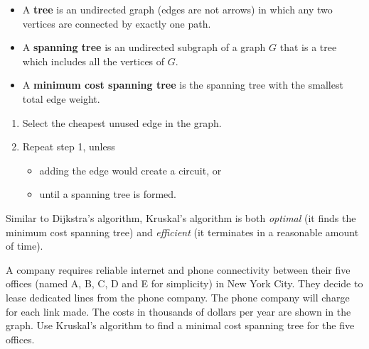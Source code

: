 \begin{definition}
  \begin{itemize}
  \item A \textbf{tree} is an undirected graph (edges are not arrows)
    in which any two vertices are connected by exactly one path.
  \item A \textbf{spanning tree} is an undirected subgraph of a graph
    \(G\) that is a tree which includes all the vertices of \(G\).
  \item A \textbf{minimum cost spanning tree} is the spanning tree
    with the smallest total edge weight.
  \end{itemize}
\end{definition}

\begin{algorithm}
  \begin{enumerate}
  \item Select the cheapest unused edge in the graph.
  \item Repeat step 1, unless
    \begin{itemize}
    \item adding the edge would create a circuit, or
    \item until a spanning tree is formed.
    \end{itemize}
  \end{enumerate}
\end{algorithm}

\begin{note}
  Similar to Dijkstra's algorithm, Kruskal's algorithm is both
  \emph{optimal} (it finds the minimum cost spanning tree) and
  \emph{efficient} (it terminates in a reasonable amount of time).
\end{note}

\begin{exercise}
  A company requires reliable internet and phone connectivity between
  their five offices (named A, B, C, D and E for simplicity) in New
  York City. They decide to lease dedicated lines from the phone
  company. The phone company will charge for each link made. The costs
  in thousands of dollars per year are shown in the graph. Use
  Kruskal's algorithm to find a minimal cost spanning tree for the
  five offices.

  
\end{exercise}






